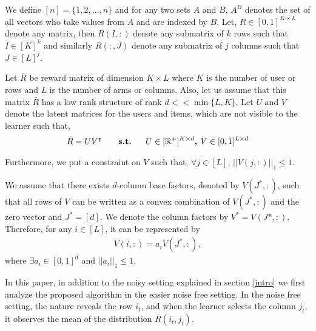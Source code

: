 	
	We define $[n] = \lbrace 1,2,\ldots, n\rbrace$ and for any two sets $A$ and $B$, $A^B$ denotes the set of all vectors who take values from $A$ and are indexed by $B$. Let, $R\in [0,1]^{K\times L}$ denote any matrix, then $R(I,:)$ denote any submatrix of $k$ rows such that $I\in[K]^k$ and similarly $R(:,J)$ denote any submatrix of $j$ columns such that $J\in[L]^{j}$.
	
	Let $\bar{R}$ be reward matrix of  dimension $K\times L$ where $K$ is the number of user or rows and $L$ is the number of arms or columns. Also, let us assume that this matrix  $\bar{R}$ has a low rank structure of rank $d << \min\lbrace L,K\rbrace$. Let $U$ and $V$ denote the latent matrices for the users and items, which are not visible to the learner such that,
\begin{align*}
	\bar{R} = UV^{\intercal} \textbf{ \hspace*{4mm}   s.t.   \hspace*{4mm}} U\in [ \mathbb{R}^+ ]^{K\times d} \textbf{, } V\in  [0,1]^{L\times d} 
\end{align*}	  
	
	Furthermore, we put a constraint on $V$ such that, $\forall j\in [L]$, $ ||V(j,:)||_1 \leq 1$. 
	
	
\begin{assumption}
\label{assm:1}
We assume that there exists $d$-column base factors, denoted by $V(J^*,:)$, such that all rows of $V$ can be written as a convex combination of $V(J^*,:)$ and the zero vector and $J^* = [d]$. We denote the column factors by $V^* = V(J*,:)$. Therefore, for any $i\in [L]$, it can be represented by
\begin{align*}
V(i,:) = a_i V(J^*,:) , 
\end{align*}
where $\exists a_i\in [0,1]^{d}$ and $ ||a_i||_1 \leq 1$.
\end{assumption}

In this paper, in addition to the noisy setting explained in section \ref{intro} we first analyze the proposed algorithm in the easier noise free setting. In the noise free setting, the nature reveals the row $i_t$, and when the learner selects the column $j_t$, it observes the mean of the distribution $\bar{R}(i_t,j_t)$.

